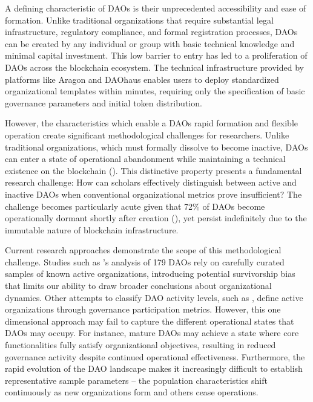 A defining characteristic of DAOs is their unprecedented accessibility and ease of formation. Unlike traditional organizations that require substantial legal infrastructure, regulatory compliance, and formal registration processes, DAOs can be created by any individual or group with basic technical knowledge and minimal capital investment. This low barrier to entry has led to a proliferation of DAOs across the blockchain ecosystem. The technical infrastructure provided by platforms like Aragon and DAOhaus enables users to deploy standardized organizational templates within minutes, requiring only the specification of basic governance parameters and initial token distribution.

However, the characteristics which enable a DAOs rapid formation and flexible operation create significant methodological challenges for researchers. Unlike traditional organizations, which must formally dissolve to become inactive, DAOs can enter a state of operational abandonment while maintaining a technical existence on the blockchain (\cite{wright2015decentralized}). This distinctive property presents a fundamental research challenge: How can scholars effectively distinguish between active and inactive DAOs when conventional organizational metrics prove insufficient? The challenge becomes particularly acute given that 72\% of DAOs become operationally dormant shortly after creation (\cite{alphaquest2024dead}), yet persist indefinitely due to the immutable nature of blockchain infrastructure.

Current research approaches demonstrate the scope of this methodological challenge. Studies such as \textcite{monteiro2024exploring}'s analysis of 179 DAOs rely on carefully curated samples of known active organizations, introducing potential survivorship bias that limits our ability to draw broader conclusions about organizational dynamics. Other attempts to classify DAO activity levels, such as \textcite{bellavitis2023rise}, define active organizations through governance participation metrics. However, this one dimensional approach may fail to capture the different operational states that DAOs may occupy. For instance, mature DAOs may achieve a state where core functionalities fully satisfy organizational objectives, resulting in reduced governance activity despite continued operational effectiveness. Furthermore, the rapid evolution of the DAO landscape makes it increasingly difficult to establish representative sample parameters -- the population characteristics shift continuously as new organizations form and others cease operations.

